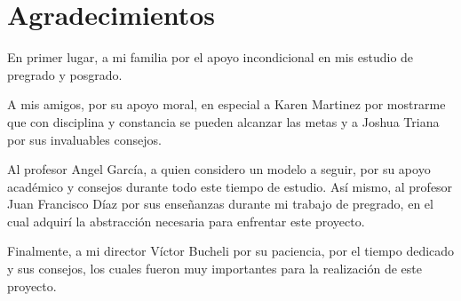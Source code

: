 \section*{Agradecimientos}

En primer lugar, a mi familia por el apoyo incondicional en mis estudio de pregrado y posgrado.

A mis amigos, por su apoyo moral, en especial a Karen Martinez por mostrarme que con disciplina y constancia se pueden alcanzar las metas y a Joshua Triana por sus invaluables consejos.

Al profesor Angel García, a quien considero un modelo a seguir, por su apoyo académico y consejos durante todo este tiempo de estudio. Así mismo, al profesor Juan Francisco Díaz por sus enseñanzas durante mi trabajo de pregrado, en el cual adquirí la abstracción necesaria para enfrentar este proyecto.

Finalmente, a mi director Víctor Bucheli por su paciencia, por el tiempo dedicado y sus consejos, los cuales fueron muy importantes para la realización de este proyecto.